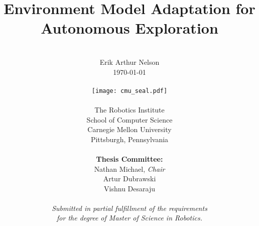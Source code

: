 \author{
  \\
        Erik Arthur Nelson \\
        \today \\
  \\
        \texttt{[image: cmu\_seal.pdf]}
  \\
  \\
        The Robotics Institute \\
        School of Computer Science \\
        Carnegie Mellon University \\
        Pittsburgh, Pennsylvania \\
  \\
        {\bf Thesis Committee:} \\
        Nathan Michael, {\it Chair} \\
        Artur Dubrawski \\
        Vishnu Desaraju \\
  \\
        \textit{Submitted in partial fulfillment of the requirements} \\
        \textit{for the degree of Master of Science in Robotics.}
}

\title{\bf{
  Environment Model Adaptation for Autonomous Exploration
}}

\date{}

